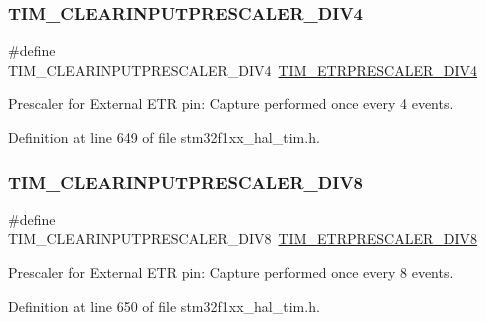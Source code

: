 \subsubsection{\texorpdfstring{T\+I\+M\+\_\+\+C\+L\+E\+A\+R\+I\+N\+P\+U\+T\+P\+R\+E\+S\+C\+A\+L\+E\+R\+\_\+\+D\+I\+V4}{TIM\_CLEARINPUTPRESCALER\_DIV4}}
{\footnotesize\ttfamily \#define T\+I\+M\+\_\+\+C\+L\+E\+A\+R\+I\+N\+P\+U\+T\+P\+R\+E\+S\+C\+A\+L\+E\+R\+\_\+\+D\+I\+V4~\hyperlink{group___t_i_m___e_t_r___prescaler_gaa09da30c3cd28f1fe6b6f3f599a5212c}{T\+I\+M\+\_\+\+E\+T\+R\+P\+R\+E\+S\+C\+A\+L\+E\+R\+\_\+\+D\+I\+V4}}

Prescaler for External E\+TR pin\+: Capture performed once every 4 events. 

Definition at line 649 of file stm32f1xx\+\_\+hal\+\_\+tim.\+h.

\mbox{\label{group___t_i_m___clear_input___prescaler_ga34bc6cb7ee8800cc48b1ee6c536859cc}} 
\subsubsection{\texorpdfstring{T\+I\+M\+\_\+\+C\+L\+E\+A\+R\+I\+N\+P\+U\+T\+P\+R\+E\+S\+C\+A\+L\+E\+R\+\_\+\+D\+I\+V8}{TIM\_CLEARINPUTPRESCALER\_DIV8}}
{\footnotesize\ttfamily \#define T\+I\+M\+\_\+\+C\+L\+E\+A\+R\+I\+N\+P\+U\+T\+P\+R\+E\+S\+C\+A\+L\+E\+R\+\_\+\+D\+I\+V8~\hyperlink{group___t_i_m___e_t_r___prescaler_ga834e38200874cced108379b17a24d0b7}{T\+I\+M\+\_\+\+E\+T\+R\+P\+R\+E\+S\+C\+A\+L\+E\+R\+\_\+\+D\+I\+V8}}

Prescaler for External E\+TR pin\+: Capture performed once every 8 events. 

Definition at line 650 of file stm32f1xx\+\_\+hal\+\_\+tim.\+h.

